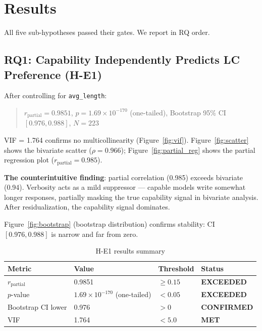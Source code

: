 \section{Results}
\label{sec:results}

All five sub-hypotheses passed their gates. We report in RQ order.

\subsection{RQ1: Capability Independently Predicts LC Preference (H-E1)}

After controlling for \texttt{avg\_length}:

\begin{quote}
$r_{\mathrm{partial}} = 0.9851$, $p = 1.69 \times 10^{-170}$ (one-tailed),
Bootstrap 95\% CI $[0.976, 0.988]$, $N=223$
\end{quote}

VIF = 1.764 confirms no multicollinearity (Figure~\ref{fig:vif}). Figure~\ref{fig:scatter}
shows the bivariate scatter ($\rho = 0.966$); Figure~\ref{fig:partial_reg} shows the partial
regression plot ($r_{\mathrm{partial}} = 0.985$).

\textbf{The counterintuitive finding}: partial correlation (0.985) exceeds bivariate (0.94).
Verbosity acts as a mild suppressor --- capable models write somewhat longer responses,
partially masking the true capability signal in bivariate analysis. After residualization, the
capability signal dominates.

Figure~\ref{fig:bootstrap} (bootstrap distribution) confirms stability: CI $[0.976, 0.988]$
is narrow and far from zero.

\begin{table}[h]
\centering
\caption{H-E1 results summary}
\label{tab:he1}
\begin{tabular}{llll}
\toprule
Metric & Value & Threshold & Status \\
\midrule
$r_{\mathrm{partial}}$ & 0.9851 & $\geq 0.15$ & \textbf{EXCEEDED} \\
$p$-value & $1.69 \times 10^{-170}$ (one-tailed) & $< 0.05$ & \textbf{EXCEEDED} \\
Bootstrap CI lower & 0.976 & $> 0$ & \textbf{CONFIRMED} \\
VIF & 1.764 & $< 5.0$ & \textbf{MET} \\
\bottomrule
\end{tabular}
\end{table}

